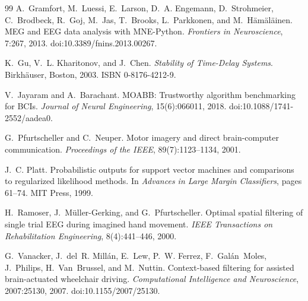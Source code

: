 \documentclass[11pt,a4paper]{article}
\theoremstyle{plain}
\theoremstyle{definition}
\begin{document}
\begin{thebibliography}{99}
A.~Gramfort, M.~Luessi, E.~Larson, D.~A. Engemann, D.~Strohmeier,
C.~Brodbeck, R.~Goj, M.~Jas, T.~Brooks, L.~Parkkonen, and
M.~H\"am\"al\"ainen.
\newblock MEG and EEG data analysis with MNE-Python.
\newblock \emph{Frontiers in Neuroscience}, 7:267, 2013.
\newblock doi:10.3389/fnins.2013.00267.

K.~Gu, V.~L. Kharitonov, and J.~Chen.
\newblock \emph{Stability of Time-Delay Systems}.
\newblock Birkh\"auser, Boston, 2003.
\newblock ISBN 0-8176-4212-9.

V.~Jayaram and A.~Barachant.
\newblock MOABB: Trustworthy algorithm benchmarking for BCIs.
\newblock \emph{Journal of Neural Engineering}, 15(6):066011, 2018.
\newblock doi:10.1088/1741-2552/aadea0.

G.~Pfurtscheller and C.~Neuper.
\newblock Motor imagery and direct brain-computer communication.
\newblock \emph{Proceedings of the IEEE}, 89(7):1123--1134, 2001.

J.~C. Platt.
\newblock Probabilistic outputs for support vector machines and
  comparisons to regularized likelihood methods.
\newblock In \emph{Advances in Large Margin Classifiers}, pages 61--74.
  MIT Press, 1999.

H.~Ramoser, J.~M\"uller-Gerking, and G.~Pfurtscheller.
\newblock Optimal spatial filtering of single trial EEG during imagined
  hand movement.
\newblock \emph{IEEE Transactions on Rehabilitation Engineering},
  8(4):441--446, 2000.

G.~Vanacker, J.~del~R. Mill\'an, E.~Lew, P.~W. Ferrez, F.~Gal\'an~Moles,
J.~Philips, H.~Van~Brussel, and M.~Nuttin.
\newblock Context-based filtering for assisted brain-actuated wheelchair
  driving.
\newblock \emph{Computational Intelligence and Neuroscience},
  2007:25130, 2007.
\newblock doi:10.1155/2007/25130.

\end{thebibliography}
\end{document}
